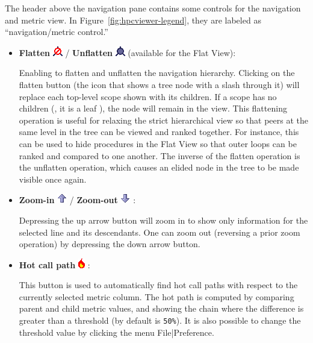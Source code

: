 The header above the navigation pane contains some controls for the navigation and metric view.
In Figure~\ref{fig:hpcviewer-legend}, they are labeled as ``navigation/metric control.''
\begin{itemize}

\item \textbf{Flatten} \includegraphics[scale=.8]{fig/hpcviewer-button-flatten.png} /
      \textbf{Unflatten} \includegraphics[scale=.8]{fig/hpcviewer-button-unflatten.png}
      (available for the Flat View):

Enabling to flatten and unflatten the navigation hierarchy.
Clicking on the flatten button (the icon that shows a tree node with a slash through it) will replace each top-level scope shown with its children.
If a scope has no children (\ie{}, it is a leaf ), the node will remain in the view.
This flattening operation is useful for relaxing the strict hierarchical view so that peers at the same level in the tree can be viewed and ranked together.
For instance, this can be used to hide procedures in the Flat View so that outer loops can be ranked and compared to one another.
The inverse of the flatten operation is the unflatten operation, which causes an elided node in the tree to be made visible once again.

\item \textbf{Zoom-in} \includegraphics[scale=.8]{fig/hpcviewer-button-zoomin.png} /
      \textbf{Zoom-out} \includegraphics[scale=.8]{fig/hpcviewer-button-zoomout.png} :

Depressing the up arrow button will zoom in to show only information for the selected line and its descendants.
One can zoom out (reversing a prior zoom operation) by depressing the down arrow button.

\item \textbf{Hot call path} \includegraphics[scale=.8]{fig/hpcviewer-button-hotpath.png} :

This button is used to automatically find hot call paths with respect to the currently selected metric column.
The hot path is computed by comparing parent and child metric values, and showing the chain where the difference is greater than a threshold (by default is \texttt{50\%}).
It is also possible to change the threshold value by clicking the menu File|Preference.


\end{itemize}
